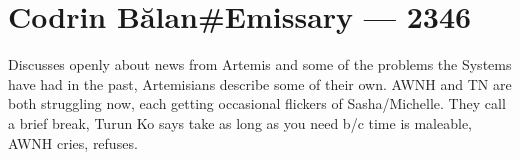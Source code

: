 \hypertarget{codrin-bux103lanemissary-2346}{%
\chapter{Codrin Bălan\#Emissary — 2346}\label{codrin-bux103lanemissary-2346}}

Discusses openly about news from Artemis and some of the problems the Systems have had in the past, Artemisians describe some of their own. AWNH and TN are both struggling now, each getting occasional flickers of Sasha/Michelle. They call a brief break, Turun Ko says take as long as you need b/c time is maleable, AWNH cries, refuses.
